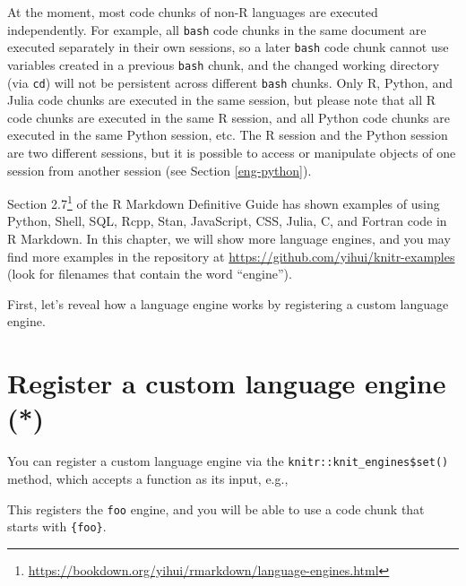 \documentclass[
  11pt,
]{krantz}
\newenvironment{Shaded}{\begin{snugshade}}{\end{snugshade}}
\newcommand{\CommentTok}[1]{\textcolor[rgb]{0.37,0.37,0.37}{\textit{#1}}}
\newcommand{\ControlFlowTok}[1]{\textcolor[rgb]{0.27,0.27,0.27}{\textbf{#1}}}
\newcommand{\DataTypeTok}[1]{\textcolor[rgb]{0.27,0.27,0.27}{#1}}
\newcommand{\KeywordTok}[1]{\textcolor[rgb]{0.27,0.27,0.27}{\textbf{#1}}}
\newcommand{\NormalTok}[1]{#1}
\newcommand{\OperatorTok}[1]{\textcolor[rgb]{0.43,0.43,0.43}{\textbf{#1}}}
\renewcommand{\href}[2]{#2\footnote{\url{#1}}}
\begin{document}
At the moment, most code chunks of non-R languages are executed independently. For example, all \texttt{bash} code chunks in the same document are executed separately in their own sessions, so a later \texttt{bash} code chunk cannot use variables created in a previous \texttt{bash} chunk, and the changed working directory (via \texttt{cd}) will not be persistent across different \texttt{bash} chunks. Only R, Python, and Julia code chunks are executed in the same session, but please note that all R code chunks are executed in the same R session, and all Python code chunks are executed in the same Python session, etc. The R session and the Python session are two different sessions, but it is possible to access or manipulate objects of one session from another session (see Section \ref{eng-python}).

\href{https://bookdown.org/yihui/rmarkdown/language-engines.html}{Section 2.7} of the R Markdown Definitive Guide \citep{rmarkdown2018} has shown examples of using Python, Shell, SQL, Rcpp, Stan, JavaScript, CSS, Julia, C, and Fortran code in R Markdown. In this chapter, we will show more language engines, and you may find more examples in the repository at \url{https://github.com/yihui/knitr-examples} (look for filenames that contain the word ``engine'').

First, let's reveal how a language engine works by registering a custom language engine.

\hypertarget{custom-engine}{%
\section{Register a custom language engine (*)}\label{custom-engine}}

You can register a custom language engine via the \texttt{knitr::knit\_engines\$set()} method, which accepts a function as its input, e.g.,

\begin{Shaded}
\end{Shaded}

This registers the \texttt{foo} engine, and you will be able to use a code chunk that starts with \texttt{\textasciigrave{}\textasciigrave{}\textasciigrave{}\{foo\}}.
\end{document}
